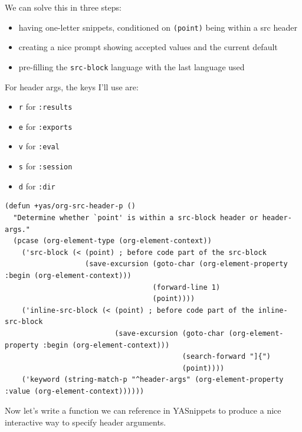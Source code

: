 \documentclass[11pt]{article}
\begin{document}
We can solve this in three steps:
\begin{itemize}
\item having one-letter snippets, conditioned on \texttt{(point)} being within a src header
\item creating a nice prompt showing accepted values and the current default
\item pre-filling the \texttt{src-block} language with the last language used
\end{itemize}

For header args, the keys I'll use are:
\begin{itemize}
\item \texttt{r} for \texttt{:results}
\item \texttt{e} for \texttt{:exports}
\item \texttt{v} for \texttt{:eval}
\item \texttt{s} for \texttt{:session}
\item \texttt{d} for \texttt{:dir}
\end{itemize}

\begin{verbatim}
(defun +yas/org-src-header-p ()
  "Determine whether `point' is within a src-block header or header-args."
  (pcase (org-element-type (org-element-context))
    ('src-block (< (point) ; before code part of the src-block
                   (save-excursion (goto-char (org-element-property :begin (org-element-context)))
                                   (forward-line 1)
                                   (point))))
    ('inline-src-block (< (point) ; before code part of the inline-src-block
                          (save-excursion (goto-char (org-element-property :begin (org-element-context)))
                                          (search-forward "]{")
                                          (point))))
    ('keyword (string-match-p "^header-args" (org-element-property :value (org-element-context))))))
\end{verbatim}

Now let's write a function we can reference in YASnippets to produce a nice
interactive way to specify header arguments.
\end{document}
